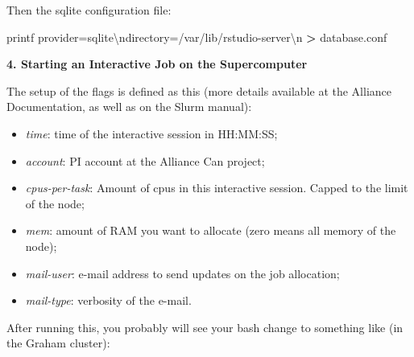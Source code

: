 \documentclass[
]{book}
\newenvironment{Shaded}{\begin{snugshade}}{\end{snugshade}}
\newcommand{\AttributeTok}[1]{\textcolor[rgb]{0.77,0.63,0.00}{#1}}
\newcommand{\BuiltInTok}[1]{#1}
\newcommand{\ExtensionTok}[1]{#1}
\newcommand{\NormalTok}[1]{#1}
\newcommand{\OperatorTok}[1]{\textcolor[rgb]{0.81,0.36,0.00}{\textbf{#1}}}
\newcommand{\StringTok}[1]{\textcolor[rgb]{0.31,0.60,0.02}{#1}}
\providecommand{\tightlist}{%
  \setlength{\itemsep}{0pt}\setlength{\parskip}{0pt}}
\begin{document}
Then the sqlite configuration file:

\begin{Shaded}
\begin{Highlighting}[]
\BuiltInTok{printf} \StringTok{\textquotesingle{}provider=sqlite\textbackslash{}ndirectory=/var/lib/rstudio{-}server\textbackslash{}n\textquotesingle{}} \OperatorTok{\textgreater{}}\NormalTok{ database.conf}
\end{Highlighting}
\end{Shaded}

\textbf{4. Starting an Interactive Job on the Supercomputer}

\begin{Shaded}
\end{Shaded}

The setup of the flags is defined as this (more details available at the Alliance Documentation, as well as on the Slurm manual):

\begin{itemize}
\tightlist
\item
  \emph{time}: time of the interactive session in HH:MM:SS;
\item
  \emph{account}: PI account at the Alliance Can project;
\item
  \emph{cpus-per-task}: Amount of cpus in this interactive session. Capped to the limit of the node;
\item
  \emph{mem}: amount of RAM you want to allocate (zero means all memory of the node);
\item
  \emph{mail-user}: e-mail address to send updates on the job allocation;
\item
  \emph{mail-type}: verbosity of the e-mail.
\end{itemize}

After running this, you probably will see your bash change to something like (in the Graham cluster):
\end{document}
